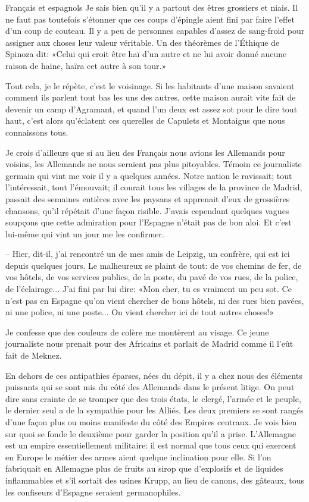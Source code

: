 \begin{chapter}{Français et espagnols}
Je sais bien qu'il y a partout des êtres grossiers et niais. Il ne faut
pas toutefois s'étonner que ces coups d'épingle aient fini par faire
l'effet d'un coup de couteau. Il y a peu de personnes capables d'assez
de sang-froid pour assigner aux choses leur valeur véritable. Un des
théorèmes de l'Éthique de Spinoza dit: «Celui qui croit être haï d'un
autre et ne lui avoir donné aucune raison de haine, haïra cet autre à
son tour.»

Tout cela, je le répète, c'est le voisinage. Si les habitants d'une
maison savaient comment ils parlent tout bas les uns des autres, cette
maison aurait vite fait de devenir un camp d'Agramant, et quand l'un
deux est assez sot pour le dire tout haut, c'est alors qu'éclatent ces
querelles de Capulets et Montaigus que nous connaissons tous.

Je crois d'ailleurs que si au lieu des Français nous avions les
Allemands pour voisins, les Allemands ne nous seraient pas plus
pitoyables. Témoin ce journaliste germain qui vint me voir il y a
quelques années. Notre nation le ravissait; tout l'intéressait, tout
l'émouvait; il courait tous les villages de la province de Madrid,
passait des semaines entières avec les paysans et apprenait d'eux de
grossières chansons, qu'il répétait d'une façon risible. J'avais
cependant quelques vagues soupçons que cette admiration pour l'Espagne
n'était pas de bon aloi. Et c'est lui-même qui vint un jour me les
confirmer.

-- Hier, dit-il, j'ai rencontré un de mes amis de Leipzig, un confrère,
qui est ici depuis quelques jours. Le malheureux se plaint de tout: de
vos chemins de fer, de vos hôtels, de vos services publics, de la poste,
du pavé de vos rues, de la police, de l'éclairage... J'ai fini par lui
dire: «Mon cher, tu es vraiment un peu sot. Ce n'est pas en Espagne
qu'on vient chercher de bons hôtels, ni des rues bien pavées, ni une
police, ni une poste... On vient chercher ici de tout autres choses!»

Je confesse que des couleurs de colère me montèrent au visage. Ce jeune
journaliste nous prenait pour des Africains et parlait de Madrid comme
il l'eût fait de Meknez.

En dehors de ces antipathies éparses, nées du dépit, il y a chez nous
des éléments puissants qui se sont mis du côté des Allemands dans le
présent litige. On peut dire sans crainte de se tromper que des trois
états, le clergé, l'armée et le peuple, le dernier seul a de la
sympathie pour les Alliés. Les deux premiers se sont rangés d'une façon
plus ou moins manifeste du côté des Empires centraux. Je vois bien sur
quoi se fonde le deuxième pour garder la position qu'il a prise.
L'Allemagne est un empire essentiellement militaire: il est normal que
tous ceux qui exercent en Europe le métier des armes aient quelque
inclination pour elle. Si l'on fabriquait en Allemagne plus de fruits au
sirop que d'explosifs et de liquides inflammables et s'il sortait des
usines Krupp, au lieu de canons, des gâteaux, tous les confiseurs
d'Espagne seraient germanophiles.


\end{chapter}
